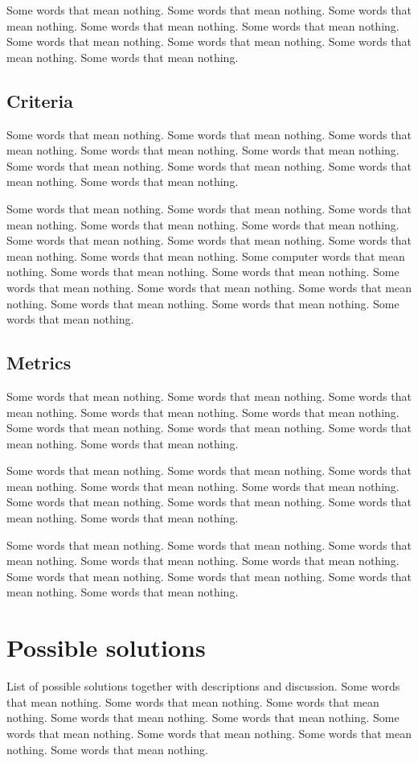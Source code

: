 \documentclass[11pt, a4paper]{article}
\begin{document}
Some words that mean nothing. Some words that mean nothing. Some words that mean nothing. Some words that mean nothing. Some words that mean nothing. Some words that mean nothing. Some words that mean nothing. Some words that mean nothing. Some words that mean nothing.

\subsection{Criteria}
Some words that mean nothing. Some words that mean nothing. Some words that mean nothing. Some words that mean nothing. Some words that mean nothing. Some words that mean nothing. Some words that mean nothing. Some words that mean nothing. Some words that mean nothing.

Some words that mean nothing. Some words that mean nothing. Some words that mean nothing. Some words that mean nothing. Some words that mean nothing. Some words that mean nothing. Some words that mean nothing. Some words that mean nothing. Some words that mean nothing. Some computer words that mean nothing. Some words that mean nothing. Some words that mean nothing. Some words that mean nothing. Some words that mean nothing. Some words that mean nothing. Some words that mean nothing. Some words that mean nothing. Some words that mean nothing.

\subsection{Metrics}
Some words that mean nothing. Some words that mean nothing. Some words that mean nothing. Some words that mean nothing. Some words that mean nothing. Some words that mean nothing. Some words that mean nothing. Some words that mean nothing. Some words that mean nothing.

Some words that mean nothing. Some words that mean nothing. Some words that mean nothing. Some words that mean nothing. Some words that mean nothing. Some words that mean nothing. Some words that mean nothing. Some words that mean nothing. Some words that mean nothing.

Some words that mean nothing. Some words that mean nothing. Some words that mean nothing. Some words that mean nothing. Some words that mean nothing. Some words that mean nothing. Some words that mean nothing. Some words that mean nothing. Some words that mean nothing.

\section{Possible solutions}
List of possible solutions together with descriptions and discussion.
Some words that mean nothing. Some words that mean nothing. Some words that mean nothing. Some words that mean nothing. Some words that mean nothing. Some words that mean nothing. Some words that mean nothing. Some words that mean nothing. Some words that mean nothing.
\end{document}

